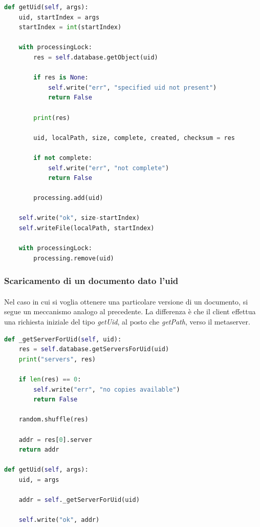 \documentclass{article}
\begin{document}
\begin{lstlisting}[language=Python, title=Codice]
def getUid(self, args):
    uid, startIndex = args
    startIndex = int(startIndex)

    with processingLock:
        res = self.database.getObject(uid)

        if res is None:
            self.write("err", "specified uid not present")
            return False

        print(res)

        uid, localPath, size, complete, created, checksum = res

        if not complete:
            self.write("err", "not complete")
            return False

        processing.add(uid)

    self.write("ok", size-startIndex)
    self.writeFile(localPath, startIndex)

    with processingLock:
        processing.remove(uid)
\end{lstlisting}

\subsubsection{Scaricamento di un documento dato l'uid}

\paragraph{} Nel caso in cui si voglia ottenere una particolare versione di un documento, si segue un meccanismo analogo al precedente. La differenza è che il client effettua una richiesta iniziale del tipo \emph{getUid}, al posto che \emph{getPath}, verso il metaserver. 

\begin{lstlisting}[language=Python, title=Metaserver]
def _getServerForUid(self, uid):
    res = self.database.getServersForUid(uid)
    print("servers", res)

    if len(res) == 0:
        self.write("err", "no copies available")
        return False

    random.shuffle(res)

    addr = res[0].server
    return addr

def getUid(self, args):
    uid, = args

    addr = self._getServerForUid(uid)

    self.write("ok", addr)
\end{lstlisting}
\end{document}
